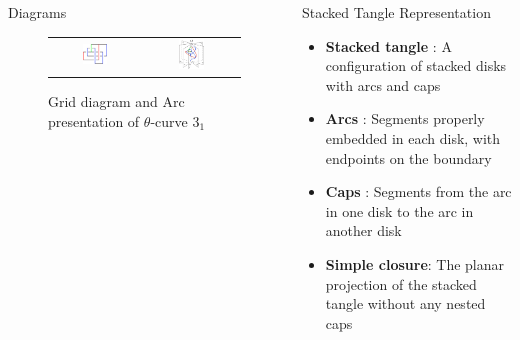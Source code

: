 \documentclass[final]{beamer}
\begin{document}
\begin{frame}[t]
\begin{columns}[t]
\begin{block}{Diagrams}
\begin{Diagrams}
      \begin{figure}[h]
        \centering
        \begin{tabular}{cc}
          \includegraphics[width=0.3\textwidth]{figure/grid.png} &
          \includegraphics[width=0.3\textwidth]{figure/openbook.png} \\
        \end{tabular}
        \caption{Grid diagram and Arc presentation of $\theta$-curve $3_1$}
      \end{figure}
    \end{Diagrams}

  \end{block}
  \begin{block}{Stacked Tangle Representation}

  \begin{itemize}
    \item \textbf{Stacked tangle} : A configuration of stacked disks with arcs and caps
    \item \textbf{Arcs} : Segments properly embedded in each disk, with endpoints on the boundary
    \item \textbf{Caps} : Segments from the arc in one disk to the arc in another disk
    \item \textbf{Simple closure}: The planar projection of the stacked tangle without any nested caps
  \end{itemize}

  


\end{block}
\end{columns}
\end{frame}
\end{document}
